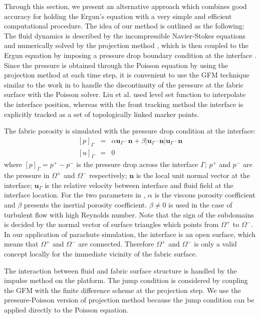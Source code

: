 Through this section, we present an alternative approach which combines 
good accuracy for holding the Ergun's equation with a very simple and efficient 
computational procedure. The idea of our method is 
outlined as the following: The fluid dynamics is 
described by the incompressible Navier-Stokes equations and numerically 
solved by the projection method \cite{Kim1985Application}, 
which is then coupled to the Ergun equation \cite{Nield2013} by imposing a pressure drop boundary condition at the interface \cite{caiazzo2011}. Since the pressure is obtained 
through the Poisson equation by using the projection method at each time step, 
it is convenient to use the GFM technique similar to the work in 
\cite{fedkiw1999,kang2000boundary,liu2000boundary} to handle the 
discontinuity of the pressure at the fabric surface with the Poisson 
solver. Liu et al. \cite{liu2000boundary} used level set function to 
interpolate the interface position, whereas with the front tracking method 
the interface is explicitly tracked as a set of topologically linked marker points.

The fabric porosity is simulated with the pressure drop condition at the interface:
\begin{eqnarray} \label{jumpcond} {[p]}_{\Gamma} &=& \alpha
\mathbf{u}_\Gamma\cdot \mathbf{n} + \beta |\mathbf{u}_\Gamma\cdot \mathbf{n}|
\mathbf{u}_\Gamma\cdot \mathbf{n} \\
{[u]}_{\Gamma} &=& 0 \end{eqnarray}
where $[p]_{\Gamma}=p^+ - p^-$ is the
pressure drop across the interface $\Gamma$; $p^+$ and $p^-$ are the pressure in
$\Omega^+$ and $\Omega^-$ respectively; $\mathbf{n}$ is the local unit normal
vector at the interface; $\mathbf{u}_\Gamma$ is the relative velocity between
interface and fluid field at the interface location. For the two parameters in
, $\alpha$ is the viscous porosity coefficient and $\beta$ presents
the inertial porosity coefficient. $\beta \neq 0$ is used in the case of
turbulent flow with high Reynolds number.  Note that the sign of the subdomains
is decided by the normal vector of surface triangles which points from
$\Omega^+$ to $\Omega^-$.  In our application of parachute simulation, the
interface is an open surface, which means that $\Omega^+$ and $\Omega^-$ are
connected. Therefore $\Omega^+$ and $\Omega^-$ is only a valid concept locally
for the immediate vicinity of the fabric surface.

The interaction between fluid and fabric surface structure is handled by the
impulse method \cite{KimLiLi12} on the \FronTierp platform. The jump condition
 is considered by coupling the GFM with the finite difference
scheme at the projection step. We use the pressure-Poisson version of
projection method because the jump condition can be applied directly to the
Poisson equation.

